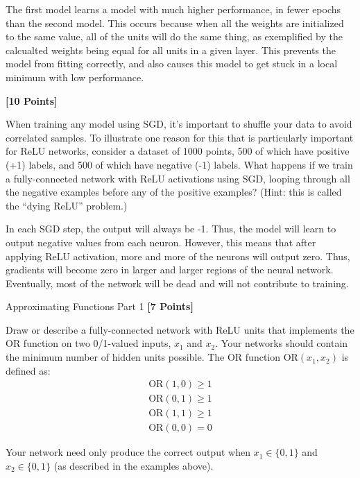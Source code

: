 \begin{subsolution}
  The first model learns a model with much higher performance, in fewer epochs than the second model. This occurs because when all the weights are initialized to the same value, all of the units will do the same thing, as exemplified by the calcualted weights being equal for all units in a given layer. This prevents the model from fitting correctly, and also causes this model to get stuck in a local minimum with low performance.
\end{subsolution}



\problem \textbf{[10 Points]}

When training any model using SGD, it's important to shuffle your data to avoid correlated samples. To illustrate one reason for this that is particularly important for ReLU networks, consider a dataset of 1000 points, 500 of which have positive (+1) labels, and 500 of which have negative (-1) labels. What happens if we train a fully-connected network with ReLU activations using SGD, looping through all the negative examples before any of the positive examples? (Hint: this is called the ``dying ReLU'' problem.)

\begin{solution}
  In each SGD step, the output will always be -1. Thus, the model will learn to output negative values from each neuron. However, this means that after applying ReLU activation, more and more of the neurons will output zero. Thus, gradients will become zero in larger and larger regions of the neural network. Eventually, most of the network will be dead and will not contribute to training.
\end{solution}



\problem Approximating Functions Part 1 \textbf{[7 Points]}

Draw or describe a fully-connected network with ReLU units that implements the OR function on two 0/1-valued inputs,  $x_1$ and $x_2$.  Your networks should contain the minimum number of hidden units possible.  The OR function $\text{OR}(x_1, x_2)$ is defined as:
\begin{gather*}
\text{OR}(1, 0) \geq 1 \\
\text{OR}(0, 1) \geq 1 \\
\text{OR}(1, 1) \geq 1 \\
\text{OR}(0, 0) = 0
\end{gather*}

Your network need only produce the correct output when $x_1 \in \{0, 1\}$ and $x_2 \in \{0, 1\}$ (as described in the examples above).

